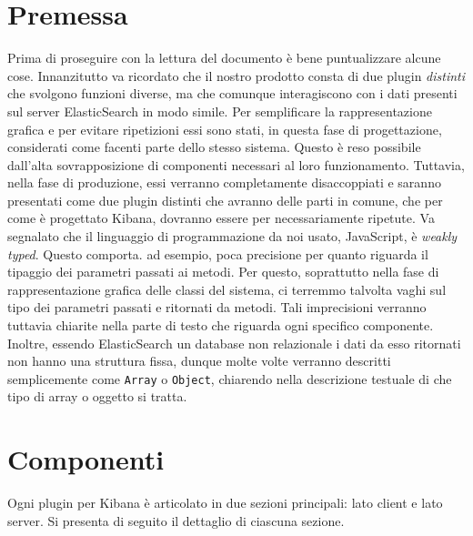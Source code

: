 
\section{Premessa}
\label{sec:premessa}
Prima di proseguire con la lettura del documento è bene puntualizzare alcune cose.
Innanzitutto va ricordato che il nostro prodotto consta di due plugin \emph{distinti} che svolgono funzioni diverse, ma che comunque interagiscono con i dati presenti sul server ElasticSearch in modo simile. Per semplificare la rappresentazione grafica e per evitare ripetizioni essi sono stati, in questa fase di progettazione, considerati come facenti parte dello stesso sistema. Questo è reso possibile dall'alta sovrapposizione di componenti necessari al loro funzionamento. Tuttavia, nella fase di produzione, essi verranno completamente disaccoppiati e saranno presentati come due plugin distinti che avranno delle parti in comune, che per come è progettato Kibana, dovranno essere per necessariamente ripetute. Va segnalato che il linguaggio di programmazione da noi usato, JavaScript, è \emph{weakly typed}. Questo comporta. ad esempio, poca precisione per quanto riguarda il tipaggio dei parametri passati ai metodi. Per questo, soprattutto nella fase di rappresentazione grafica delle classi del sistema, ci terremmo talvolta vaghi sul tipo dei parametri passati e ritornati da metodi. Tali imprecisioni verranno tuttavia chiarite nella parte di testo che riguarda ogni specifico componente. Inoltre, essendo ElasticSearch un database non relazionale i dati da esso ritornati non hanno una struttura fissa, dunque molte volte verranno descritti semplicemente come \texttt{Array} o \texttt{Object}, chiarendo nella descrizione testuale di che tipo di array o oggetto si tratta.

\section{Componenti}

Ogni plugin per Kibana è articolato in due sezioni principali: lato client e lato server. Si presenta di seguito il dettaglio di ciascuna sezione.
